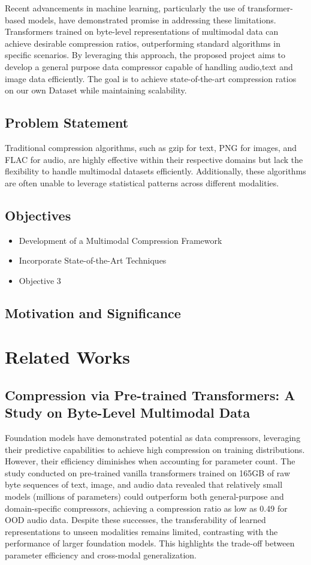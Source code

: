 \documentclass[a4paper,12pt]{article}
\begin{document}
Recent advancements in machine learning, particularly the use of transformer-based models, have demonstrated promise in addressing these limitations. Transformers trained on byte-level representations of multimodal data can achieve desirable compression ratios, outperforming standard algorithms in specific scenarios. By leveraging this approach, the proposed project aims to develop a general purpose data compressor capable of handling audio,text and image data efficiently. The goal is to achieve state-of-the-art compression ratios on our own Dataset while maintaining scalability.
\newpage
\subsection{Problem Statement}
Traditional compression algorithms, such as gzip for text, PNG for images, and FLAC for audio, are highly effective within their respective domains but lack the flexibility to handle multimodal datasets efficiently. Additionally, these algorithms are often unable to leverage statistical patterns across different modalities. 

\subsection{Objectives}
\begin{itemize}
    \item Development of a Multimodal Compression Framework
    \item Incorporate State-of-the-Art Techniques
    \item Objective 3
\end{itemize}

\subsection{Motivation and Significance}
\newpage

\section{Related Works}
\subsection{Compression via Pre-trained Transformers: A Study on Byte-Level Multimodal Data}
Foundation models have demonstrated potential as data compressors, leveraging their predictive capabilities to achieve high compression on training distributions. However, their efficiency diminishes when accounting for parameter count. The study conducted on pre-trained vanilla transformers trained on 165GB of raw byte sequences of text, image, and audio data revealed that relatively small models (millions of parameters) could outperform both general-purpose and domain-specific compressors, achieving a compression ratio as low as 0.49 for OOD audio data. Despite these successes, the transferability of learned representations to unseen modalities remains limited, contrasting with the performance of larger foundation models. This highlights the trade-off between parameter efficiency and cross-modal generalization.
\end{document}
